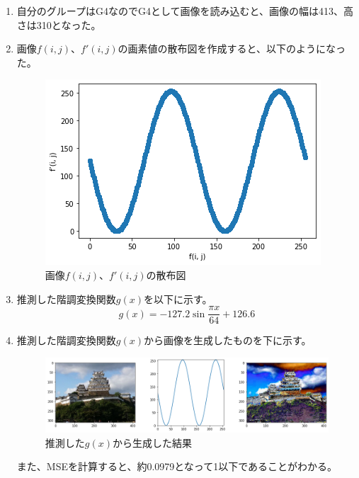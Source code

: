 \documentclass[12pt]{jarticle}
\begin{document}
\begin{enumerate}
    \item 自分のグループはG4なのでG4として画像を読み込むと、画像の幅は413、高さは310となった。
    \item 画像$f(i, j)$、$f'(i, j)$の画素値の散布図を作成すると、以下のようになった。
          \begin{figure}[h]
              \begin{center}
                  \includegraphics[scale=0.8]{kadai4_1_5.png}
              \end{center}
              \caption{画像$f(i, j)$、$f'(i, j)$の散布図}
          \end{figure}

    \item 推測した階調変換関数$g(x)$を以下に示す。
          \begin{equation*}
              g(x)= -127.2 \sin \frac{\pi x}{64} + 126.6
          \end{equation*}

          \clearpage
    \item 推測した階調変換関数$g(x)$から画像を生成したものを下に示す。
          \begin{figure}[h]
              \begin{center}
                  \includegraphics[scale=0.5]{kadai4_1_6.png}
              \end{center}
              \caption{推測した$g(x)$から生成した結果}
          \end{figure}

          また、MSEを計算すると、約0.0979となって1以下であることがわかる。
\end{enumerate}
\end{document}
